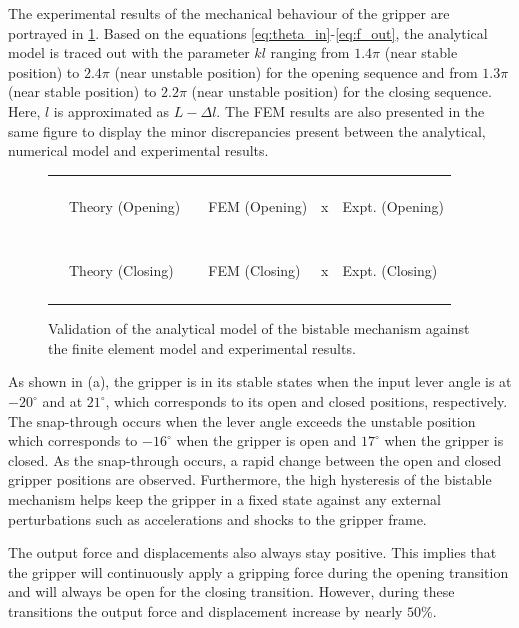 The experimental results of the mechanical behaviour of the gripper are portrayed in \cref{fig:bistable graph}. Based on the equations \ref{eq:theta_in}-\ref{eq:f_out}, the analytical model is traced out with the parameter $kl$ ranging from $1.4\pi$ (near stable position) to $2.4\pi$ (near unstable position) for the opening sequence and from $1.3\pi$ (near stable position) to $2.2\pi$ (near unstable position) for the closing sequence. Here, $l$ is approximated as $L-\Delta l$. The FEM results are also presented in the same figure to display the minor discrepancies present between the analytical, numerical model and experimental results.
\begin{figure}[hbt!] %
    \centering
    \resizebox{0.55\textwidth}{!}{}
    \begin{tabular}{l@{ }l l@{ }l l@{ }l}
        {\color{myblue} \rule[2pt]{10pt}{0.5mm} } & {\footnotesize Theory (Opening)} & {\color{myblue} \rule[2pt]{1pt}{0.5mm} \rule[2pt]{1pt}{0.5mm} \rule[2pt]{1pt}{0.5mm} } & {\footnotesize FEM (Opening)} & {\color{myblue} x } & {\footnotesize Expt. (Opening)}\\
        {\color{myred} \rule[2pt]{10pt}{0.5mm} } & {\footnotesize Theory (Closing)} & {\color{myred} \rule[2pt]{1pt}{0.5mm} \rule[2pt]{1pt}{0.5mm} \rule[2pt]{1pt}{0.5mm} } & {\footnotesize FEM (Closing)} & {\color{myred} x } & {\footnotesize Expt. (Closing)}\\
    \end{tabular}
    \caption{Validation of the analytical model of the bistable mechanism against the finite element model and experimental results.}
    \label{fig:bistable graph}
\end{figure}

As shown in \todocite (a), the gripper is in its stable states when the input lever angle is at $-20^{\circ}$ and at $21^{\circ}$, which corresponds to its open and closed positions, respectively. The snap-through occurs when the lever angle exceeds the unstable position which corresponds to $-16^{\circ}$ when the gripper is open and $17^{\circ}$ when the gripper is closed. As the snap-through occurs, a rapid change between the open and closed gripper positions are observed. Furthermore, the high hysteresis of the bistable mechanism helps keep the gripper in a fixed state against any external perturbations such as accelerations and shocks to the gripper frame.

The output force and displacements also always stay positive. This implies that the gripper will continuously apply a gripping force during the opening transition and will always be open for the closing transition. However, during these transitions the output force and displacement increase by nearly $50$\%.

